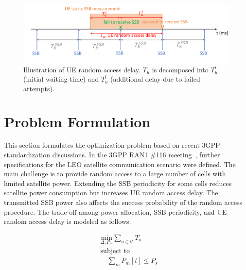 \begin{figure}[h!]
    \centering
    \includegraphics[width=1\textwidth]{figure/random access delay.pdf}
    \caption{Illustration of UE random access delay. $T_u$ is decomposed into $T_u^i$ (initial waiting time) and $T_u^l$ (additional delay due to failed attempts).}
    \label{RAD}
\end{figure}

\section{Problem Formulation}
This section formulates the optimization problem based on recent 3GPP standardization discussions. In the 3GPP RAN1 \#116 meeting~\cite{ran1-116}, further specifications for the LEO satellite communication scenario were defined. The main challenge is to provide random access to a large number of cells with limited satellite power. Extending the SSB periodicity for some cells reduces satellite power consumption but increases UE random access delay. The transmitted SSB power also affects the success probability of the random access procedure. The trade-off among power allocation, SSB periodicity, and UE random access delay is modeled as follows:

\begin{equation}
\begin{aligned}
    & \underset{\Delta, P_m}{\text{min}} \sum_{u \in \mathcal{U}} T_u \\
    & \text{subject to} \\
    & \quad \sum_{m} P_m[t] \leq P_s \\
\end{aligned}
\end{equation}

